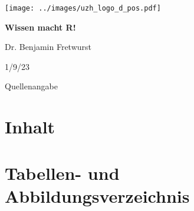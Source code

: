 \documentclass[twoside, pagesize, fontsize=11pt, dvipsnames]{scrreport} %
\begin{document}
\begin{titlepage}
\sffamily
\setlength\parindent{0pt}

\hfill \texttt{[image: ../images/uzh\_logo\_d\_pos.pdf]}\par

\vspace{5cm}


{\bfseries \fontsize{20}{26} \selectfont Wissen macht R!} \\[1ex]


\vfill

Dr. Benjamin Fretwurst\\

\vfill
{\large }
\raggedright



1/9/23 \\[.5cm]
\clearpage

\vspace*{4cm}

Quellenangabe\\[.5cm]



\end{titlepage}


\makeatletter
{}
\makeatletter

\renewcommand{\listoftables}{\@starttoc{lot}}
\renewcommand{\tableofcontents}{\@starttoc{toc}}
\renewcommand{\listoffigures}{\@starttoc{lof}}

\renewcommand{\l@table}{\@dottedtocline{1}{1em}{3em}}
\makeatother

\clearpage
\section*{Inhalt}
\label{sec:inhalt}

\tableofcontents

\clearpage

\section*{Tabellen- und Abbildungsverzeichnis}
\end{document}
